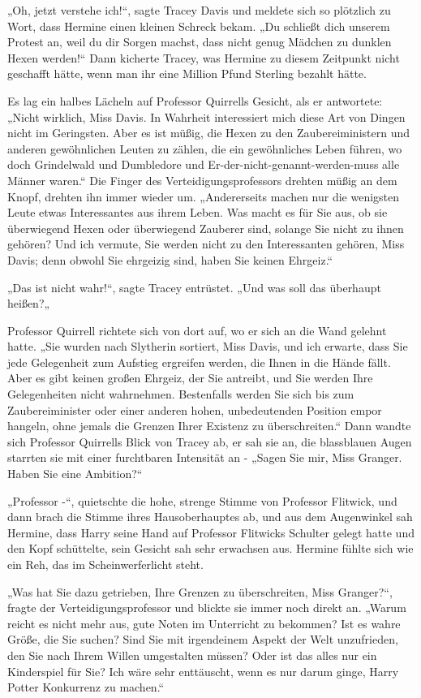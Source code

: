 {„Oh, jetzt verstehe ich!“, sagte Tracey Davis und meldete sich so plötzlich zu Wort, dass Hermine einen kleinen Schreck bekam. „Du schließt dich unserem Protest an, weil du dir Sorgen machst, dass nicht genug Mädchen zu dunklen Hexen werden!“ Dann kicherte Tracey, was Hermine zu diesem Zeitpunkt nicht geschafft hätte, wenn man ihr eine Million Pfund Sterling bezahlt hätte.

Es lag ein halbes Lächeln auf Professor Quirrells Gesicht, als er antwortete: „Nicht wirklich, Miss Davis. In Wahrheit interessiert mich diese Art von Dingen nicht im Geringsten. Aber es ist müßig, die Hexen zu den Zaubereiministern und anderen gewöhnlichen Leuten zu zählen, die ein gewöhnliches Leben führen, wo doch Grindelwald und Dumbledore und Er-der-nicht-genannt-werden-muss alle Männer waren.“ Die Finger des Verteidigungsprofessors drehten müßig an dem Knopf, drehten ihn immer wieder um. „Andererseits machen nur die wenigsten Leute etwas Interessantes aus ihrem Leben. Was macht es für Sie aus, ob sie überwiegend Hexen oder überwiegend Zauberer sind, solange Sie nicht zu ihnen gehören? Und ich vermute, Sie werden nicht zu den Interessanten gehören, Miss Davis; denn obwohl Sie ehrgeizig sind, haben Sie keinen Ehrgeiz.“

„Das ist nicht wahr!“, sagte Tracey entrüstet. „Und was soll das überhaupt heißen?„

Professor Quirrell richtete sich von dort auf, wo er sich an die Wand gelehnt hatte. „Sie wurden nach Slytherin sortiert, Miss Davis, und ich erwarte, dass Sie jede Gelegenheit zum Aufstieg ergreifen werden, die Ihnen in die Hände fällt. Aber es gibt keinen großen Ehrgeiz, der Sie antreibt, und Sie werden Ihre Gelegenheiten nicht wahrnehmen. Bestenfalls werden Sie sich bis zum Zaubereiminister oder einer anderen hohen, unbedeutenden Position empor hangeln, ohne jemals die Grenzen Ihrer Existenz zu überschreiten.“ Dann wandte sich Professor Quirrells Blick von Tracey ab, er sah sie an, die blassblauen Augen starrten sie mit einer furchtbaren Intensität an - „Sagen Sie mir, Miss Granger. Haben Sie eine Ambition?“

„Professor -“, quietschte die hohe, strenge Stimme von Professor Flitwick, und dann brach die Stimme ihres Hausoberhauptes ab, und aus dem Augenwinkel sah Hermine, dass Harry seine Hand auf Professor Flitwicks Schulter gelegt hatte und den Kopf schüttelte, sein Gesicht sah sehr erwachsen aus. Hermine fühlte sich wie ein Reh, das im Scheinwerferlicht steht.

„Was hat Sie dazu getrieben, Ihre Grenzen zu überschreiten, Miss Granger?“, fragte der Verteidigungsprofessor und blickte sie immer noch direkt an. „Warum reicht es nicht mehr aus, gute Noten im Unterricht zu bekommen? Ist es wahre Größe, die Sie suchen? Sind Sie mit irgendeinem Aspekt der Welt unzufrieden, den Sie nach Ihrem Willen umgestalten müssen? Oder ist das alles nur ein Kinderspiel für Sie? Ich wäre sehr enttäuscht, wenn es nur darum ginge, Harry Potter Konkurrenz zu machen.“

}
